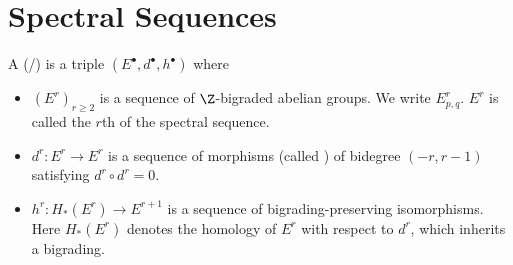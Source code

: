 \section{Spectral Sequences}
\begin{definition}
	A (/)  is a triple $(E^\bullet, d^\bullet, h^\bullet)$ where
	\begin{itemize}
		\item $(E^r)_{r \geq 2}$ is a sequence of $\Z$-bigraded abelian groups.
			We write $E^r_{p, q}$.
			$E^r$ is called the $r$th  of the spectral sequence.
		\item $d^r\colon E^r \to E^r$ is a sequence of morphisms (called ) of bidegree $(-r, r - 1)$ satisfying $d^r \circ d^r = 0$.
		\item $h^r\colon H_*(E^r) \to E^{r + 1}$ is a sequence of bigrading-preserving isomorphisms.
			Here $H_*(E^r)$ denotes the homology of $E^r$ with respect to $d^r$, which inherits a bigrading.
	\end{itemize}
\end{definition}
